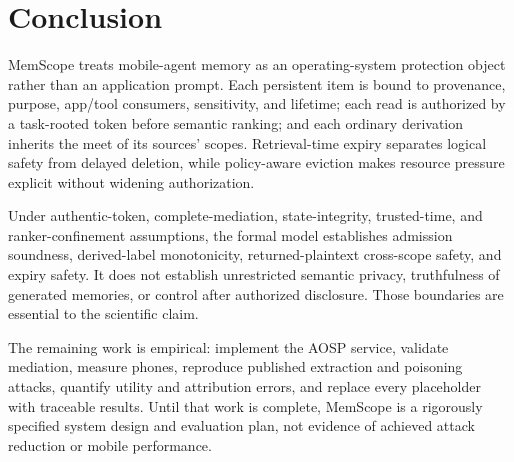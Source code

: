 \section{Conclusion}
\label{sec:conclusion}

MemScope treats mobile-agent memory as an operating-system protection object rather than an application prompt. Each persistent item is bound to provenance, purpose, app/tool consumers, sensitivity, and lifetime; each read is authorized by a task-rooted token before semantic ranking; and each ordinary derivation inherits the meet of its sources' scopes. Retrieval-time expiry separates logical safety from delayed deletion, while policy-aware eviction makes resource pressure explicit without widening authorization.

Under authentic-token, complete-mediation, state-integrity, trusted-time, and ranker-confinement assumptions, the formal model establishes admission soundness, derived-label monotonicity, returned-plaintext cross-scope safety, and expiry safety. It does not establish unrestricted semantic privacy, truthfulness of generated memories, or control after authorized disclosure. Those boundaries are essential to the scientific claim.

The remaining work is empirical: implement the AOSP service, validate mediation, measure phones, reproduce published extraction and poisoning attacks, quantify utility and attribution errors, and replace every placeholder with traceable results. Until that work is complete, MemScope is a rigorously specified system design and evaluation plan, not evidence of achieved attack reduction or mobile performance.
